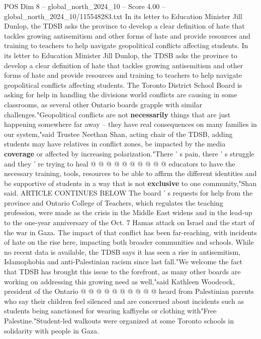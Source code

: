 \begin{textsample}{POS Dim 8 – global\_north\_2024\_10 – Score 4.00 – global\_north\_2024\_10/115548283.txt}  \label{ex:f8_pos_249}
In its letter to Education Minister Jill Dunlop, the TDSB asks the province to develop a clear definition of hate that tackles growing antisemitism and other forms of hate and provide resources and training to teachers to help navigate geopolitical conflicts affecting students.
In its letter to Education Minister Jill Dunlop, the TDSB asks the province to develop a clear definition of hate that tackles growing antisemitism and other forms of hate and provide resources and training to teachers to help navigate geopolitical conflicts affecting students.
The Toronto District School Board is asking for help in handling the divisions world conflicts are causing in some classrooms, as several other Ontario boards grapple with similar challenges."Geopolitical conflicts are not \textbf{necessarily} things that are just happening somewhere far away -- they have real consequences on many families in our system,"said Trustee Neethan Shan, acting chair of the TDSB, adding students may have relatives in conflict zones, be impacted by the media \textbf{coverage} or affected by increasing polarization."There ' s pain, there ' s struggle and they ' re trying to heal @ @ @ @ @ @ @ @ @ @ educators to have the necessary training, tools, resources to be able to affirm the different identities and be supportive of students in a way that is not \textbf{exclusive} to one community,"Shan said.
ARTICLE CONTINUES BELOW The board ' s requests for help from the province and Ontario College of Teachers, which regulates the teaching profession, were made as the crisis in the Middle East widens and in the lead-up to the one-year anniversary of the Oct. 7 Hamas attack on Israel and the start of the war in Gaza.
The impact of that conflict has been far-reaching, with incidents of hate on the rise here, impacting both broader communities and schools.
While no recent data is available, the TDSB says it has seen a rise in antisemitism, Islamophobia and anti-Palestinian racism since last fall."We welcome the fact that TDSB has brought this issue to the forefront, as many other boards are working on addressing this growing need as well,"said Kathleen Woodcock, president of the Ontario @ @ @ @ @ @ @ @ @ @ heard from Palestinian parents who say their children feel silenced and are concerned about incidents such as students being sanctioned for wearing kaffiyehs or clothing with"Free Palestine."Student-led walkouts were organized at some Toronto schools in solidarity with people in Gaza.

\end{textsample}

